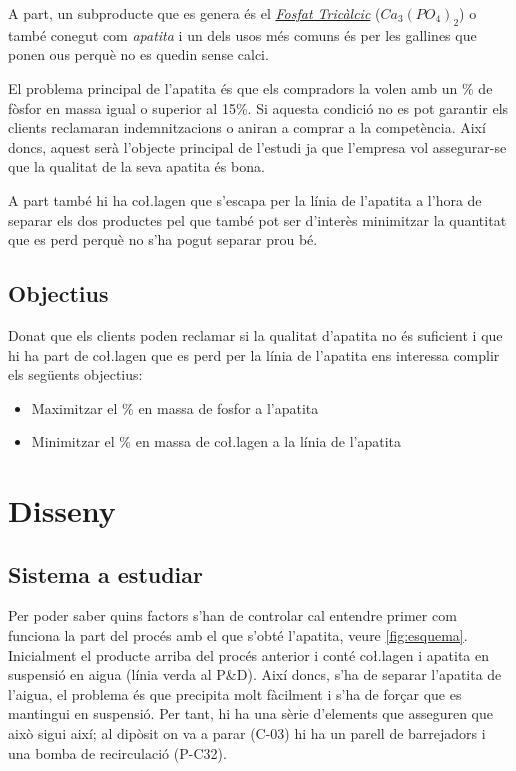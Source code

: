 \documentclass[a4paper]{article}
\begin{document}
A part, un subproducte que es genera és el \emph{\href{https://es.wikipedia.org/wiki/Fosfato_tric\%C3\%A1lcico}{Fosfat Tricàlcic}} ($Ca_3 (PO_4)_2$) o també conegut com \emph{apatita} i un dels usos més comuns és per les gallines que ponen ous perquè no es quedin sense calci. 

El problema principal de l'apatita és que els compradors la volen amb un \% de fòsfor en massa igual o superior al 15\%. Si aquesta condició no es pot garantir els clients reclamaran indemnitzacions o aniran a comprar a la competència. Així doncs, aquest serà l'objecte principal de l'estudi ja que l'empresa vol assegurar-se que la qualitat de la seva apatita és bona. 

A part també hi ha co\l.lagen que s'escapa per la línia de l'apatita a l'hora de separar els dos productes pel que també pot ser d'interès minimitzar la quantitat que es perd perquè no s'ha pogut separar prou bé.

\subsection{Objectius}
Donat que els clients poden reclamar si la qualitat d'apatita no és suficient i que hi ha part de co\l.lagen que es perd per la línia de l'apatita ens interessa complir els següents objectius:

\begin{itemize}
	\item Maximitzar el \% en massa de fosfor a l'apatita
	\item Minimitzar el \% en massa de co\l.lagen a la línia de l'apatita
\end{itemize}

\section{Disseny}

\subsection{Sistema a estudiar}
Per poder saber quins factors s'han de controlar cal entendre primer com funciona la part del procés amb el que s'obté l'apatita, veure \autoref{fig:esquema}. Inicialment el producte arriba del procés anterior i conté co\l.lagen i apatita en suspensió en aigua (línia verda al P\&D). Així doncs, s'ha de separar l'apatita de l'aigua, el problema és que precipita molt fàcilment i s'ha de forçar que es mantingui en suspensió. Per tant, hi ha una sèrie d'elements que asseguren que això sigui així; al dipòsit on va a parar (C-03) hi ha un parell de barrejadors i una bomba de recirculació (P-C32). 
\end{document}
